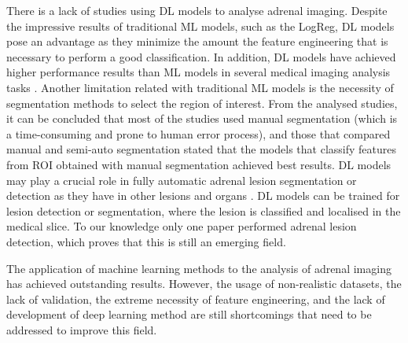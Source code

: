 \documentclass{article}
\begin{document}
There is a lack of studies using DL models to analyse adrenal imaging. Despite
the impressive results of traditional ML models, such as the LogReg, DL models
pose an advantage as they minimize the amount the feature engineering that is
necessary to perform a good classification. In addition, DL models have achieved
higher performance results than ML models in several medical imaging analysis
tasks \cite{Suganyadevi2022}. Another limitation related with traditional ML
models is the necessity of segmentation methods to select the region of
interest. From the analysed studies, it can be concluded that most of the
studies used manual segmentation (which is a time-consuming and prone to human
error process), and those that compared manual and semi-auto segmentation stated
that the models that classify features from ROI obtained with manual
segmentation achieved best results. DL models may play a crucial role in fully
automatic adrenal lesion segmentation or detection as they have in other lesions
and organs \cite{Suganyadevi2022}. DL models can be trained for lesion detection
or segmentation, where the lesion is classified and localised in the medical
slice. To our knowledge only one paper performed adrenal lesion detection, which
proves that this is still an emerging field.

The application of machine learning methods to the analysis of adrenal imaging
has achieved outstanding results. However, the usage of non-realistic datasets,
the lack of validation, the extreme necessity of feature engineering, and the
lack of development of deep learning method are still shortcomings that need to
be addressed to improve this field.

\printbibliography
\end{document}
